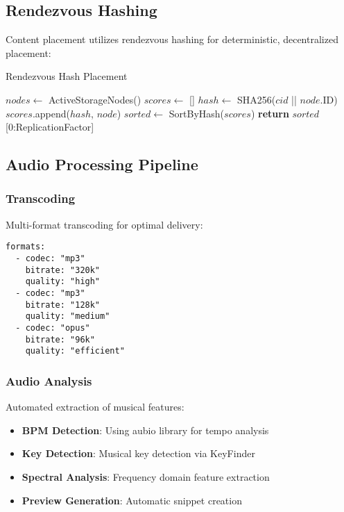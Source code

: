\documentclass[11pt,a4paper]{article}
\begin{document}
\subsection{Rendezvous Hashing}

Content placement utilizes rendezvous hashing for deterministic, decentralized placement:

\begin{algorithm}
  \caption{Rendezvous Hash Placement}
  \begin{algorithmic}[1]
    \STATE $nodes \leftarrow$ ActiveStorageNodes()
    \STATE $scores \leftarrow$ []
    \STATE $hash \leftarrow$ SHA256($cid$ || $node$.ID)
    \STATE $scores$.append($hash$, $node$)
    \ENDFOR
    \STATE $sorted \leftarrow$ SortByHash($scores$)
    \STATE \textbf{return} $sorted$[0:ReplicationFactor]
  \end{algorithmic}
\end{algorithm}

\subsection{Audio Processing Pipeline}

\subsubsection{Transcoding}
Multi-format transcoding for optimal delivery:

\begin{lstlisting}[caption=Transcoding Configuration]
formats:
  - codec: "mp3"
    bitrate: "320k"
    quality: "high"
  - codec: "mp3"
    bitrate: "128k"
    quality: "medium"
  - codec: "opus"
    bitrate: "96k"
    quality: "efficient"
\end{lstlisting}

\subsubsection{Audio Analysis}
Automated extraction of musical features:

\begin{itemize}
  \item \textbf{BPM Detection}: Using aubio library for tempo analysis
  \item \textbf{Key Detection}: Musical key detection via KeyFinder
  \item \textbf{Spectral Analysis}: Frequency domain feature extraction
  \item \textbf{Preview Generation}: Automatic snippet creation
\end{itemize}
\end{document}
